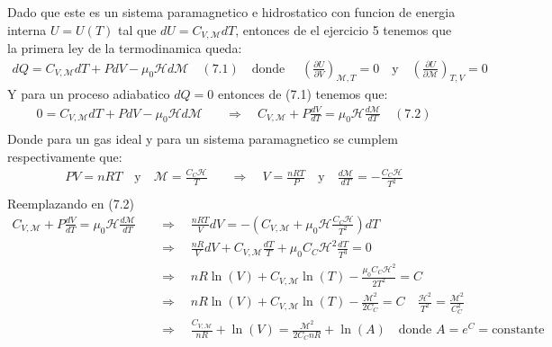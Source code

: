 \documentclass[a4paper]{article}
\begin{document}
    \begin{answer}[Punto 7]
        Dado que este es un sistema paramagnetico e hidrostatico  con funcion de energia interna $U = U(T)$ tal que $dU = C_{V, \mathscr{M}} dT$, entonces de el ejercicio 5 tenemos que la primera ley de la termodinamica queda:
        \begin{align*}
            dQ = C_{V, \mathscr{M}} dT + PdV - \mu_0 \mathscr{H} d\mathscr{M} \quad (7.1) \quad \text{donde } \quad \left(\frac{\partial U}{\partial V}\right)_{\mathscr{M},T} = 0 \quad \text{y} \quad \left(\frac{\partial U}{\partial \mathscr{M}}\right)_{T,V} = 0 
        \end{align*}
        Y para un proceso adiabatico $dQ = 0$ entonces de (7.1) tenemos que:
        \begin{align*}
            0 = C_{V, \mathscr{M}} dT + PdV - \mu_0 \mathscr{H} d\mathscr{M} \quad &\Rightarrow \quad C_{V, \mathscr{M}} + P\frac{dV}{dT}= \mu_0 \mathscr{H}\frac{d\mathscr{M}}{dT} \quad (7.2)\\
        \end{align*}
        Donde para un gas ideal y para un sistema paramagnetico se cumplem respectivamente que:
        \begin{align*}
            PV = nRT \quad \text{y} \quad \mathscr{M} = \frac{C_C \mathscr{H}}{T} \quad &\Rightarrow \quad V = \frac{nRT}{P} \quad \text{y} \quad \frac{d\mathscr{M}}{dT} = -\frac{C_C\mathscr H}{T^2}\\
        \end{align*}
        Reemplazando en (7.2)
        \begin{align*}
            C_{V, \mathscr{M}} + P\frac{dV}{dT}= \mu_0 \mathscr{H}\frac{d\mathscr{M}}{dT} \quad &\Rightarrow \quad \frac{nRT}{V} dV =  -\left( C_{V,\mathscr M} +  \mu_0 \mathscr H\frac{C_C\mathscr H}{T^2} \right)dT\\
            & \Rightarrow \quad \frac{nR}{V} dV + C_{V,\mathscr M}\frac{dT}{T}  +  \mu_0C_C\mathscr H^2 \frac{dT}{T^3} = 0\\ 
            & \Rightarrow \quad nR \ln(V) + C_{V,\mathscr M} \ln(T) -  \frac{\mu_0 C_C\mathscr H^2 }{2T^2}  = C\\ 
            & \Rightarrow \quad nR \ln(V) + C_{V,\mathscr M} \ln(T) -  \frac{\mathscr{M}^2 }{2 C_C}  = C \quad  \frac{\mathscr{H}^2}{T^2} = \frac{ \mathscr{M}^2}{C_C^2}\\
            & \Rightarrow \quad \frac{C_{V,\mathscr M}}{nR} + \ln(V)  = \frac{\mathscr{M}^2}{2 C_C nR} + \ln(A) \quad \text{donde } A = e^C = \text{constante}\\
        \end{align*}

    \end{answer}
\end{document}
